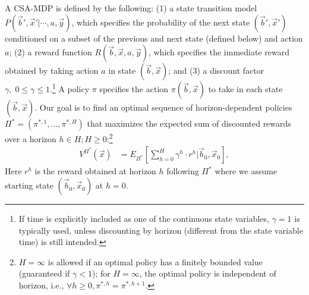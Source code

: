\documentclass[letterpaper]{article}
\begin{document}
A CSA-MDP is defined by the following: (1) a state transition model
$P(\vec{b}',\vec{x}'|\cdots,a,\vec{y})$, which specifies the probability of
the next state $(\vec{b}',\vec{x}')$ conditioned on a subset of the
previous and next state (defined below) and action $a$; (2) a reward
function $R(\vec{b},\vec{x},a,\vec{y})$, which specifies the immediate reward
obtained by taking action $a$ in state $(\vec{b},\vec{x})$; and (3) a
discount factor $\gamma, \; 0 \leq \gamma \leq 1$.\footnote{If time is
explicitly included as one of the continuous state variables, $\gamma
= 1$ is typically used, unless discounting by horizon (different from
the state variable time) is still intended.}  
A policy $\pi$
specifies the action $\pi(\vec{b},\vec{x})$ to take in each state
$(\vec{b},\vec{x})$.  Our goal is to find an optimal sequence of
horizon-dependent policies $\Pi^* = (\pi^{*,1},\ldots,\pi^{*,H})$
that maximizes the expected sum of discounted rewards over a horizon
$h \in H; H \geq 0$:\footnote{$H=\infty$ is allowed if an optimal policy has a
finitely bounded value (guaranteed if $\gamma < 1$); for $H=\infty$, 
the optimal policy is independent of horizon, 
i.e., $\forall h \geq 0, \pi^{*,h} = \pi^{*,h+1}$.}
\begin{align}
V^{\Pi^*}(\vec{x}) & = E_{\Pi^*} \left[ \sum_{h=0}^{H} \gamma^h \cdot r^h \Big| \vec{b}_0,\vec{x}_0 \right], \label{eq:vfun_def}
\end{align}
Here $r^h$ is the reward obtained at horizon $h$ following $\Pi^*$ where 
we assume starting state $(\vec{b}_0,\vec{x}_0)$ at $h=0$.
 
\end{document}

